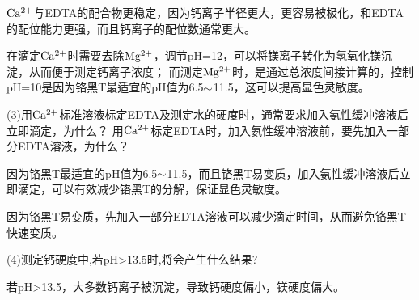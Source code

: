\documentclass[a4paper,12pt]{article}
\begin{document}
$\rm Ca^{2+}$与EDTA的配合物更稳定，因为钙离子半径更大，更容易被极化，和EDTA的配位能力更强，而且钙离子的配位数通常更大。

在滴定$\rm Ca^{2+}$时需要去除$\rm Mg^{2+}$，调节pH=12，可以将镁离子转化为氢氧化镁沉淀，从而便于测定钙离子浓度；
而测定$\rm Mg^{2+}$时，是通过总浓度间接计算的，控制pH=10是因为铬黑T最适宜的pH值为6.5$\rm \sim$11.5，这可以提高显色灵敏度。


(3)用$\rm Ca^{2+}$标准溶液标定EDTA及测定水的硬度时，通常要求加入氨性缓冲溶液后立即滴定，为什么？
用$\rm Ca^{2+}$标定EDTA时，加入氨性缓冲溶液前，要先加入一部分EDTA溶液，为什么？

因为铬黑T最适宜的pH值为6.5$\rm \sim$11.5，而且铬黑T易变质，加入氨性缓冲溶液后立即滴定，可以有效减少铬黑T的分解，保证显色灵敏度。

因为铬黑T易变质，先加入一部分EDTA溶液可以减少滴定时间，从而避免铬黑T快速变质。


(4)测定钙硬度中,若pH>13.5时,将会产生什么结果?

若pH>13.5，大多数钙离子被沉淀，导致钙硬度偏小，镁硬度偏大。



\end{document}
